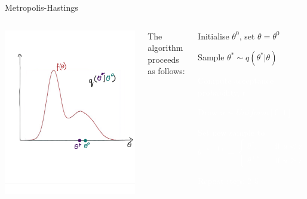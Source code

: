\documentclass[compress]{beamer}
\begin{document}
\begin{frame}[label=sec-7-3]{Metropolis-Hastings}
    \begin{columns}[c] 
    \includegraphics[width=1\linewidth]{MH2}

    The algorithm proceeds as follows:
    \begin{enumerate}
        \item Initialise $\theta^{0}$, set $\theta = \theta^{0}$
        \item Sample $\theta^* \sim q(\theta^*|\theta)$
        \textcolor{white}{
            \item[\color{white}] Compute acceptance probability, r
            \item[\color{white}] Draw $u \sim Uniform[0,1]$
            \item[\color{white}] Set new sample to 
            \[
               \theta^{(s+1)} = 
               \begin{cases}
                \theta^*, & \text{if } u < r\\
                \theta^{(s)}, & \text{if } u \geqslant r
            \end{cases}
        \]
        \item[\color{white}] Repeat steps 2-5
    }
\end{enumerate}
\end{columns}
\end{frame}
\end{document}
